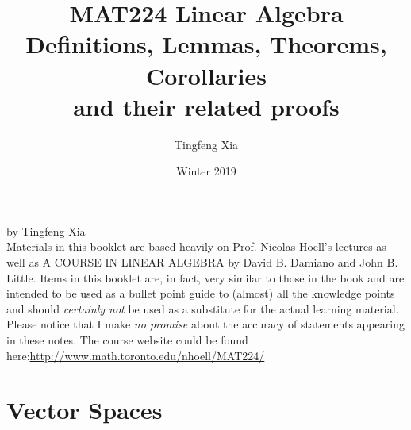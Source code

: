 \documentclass[oneside, 12pt]{book}
\title{%
  \textbf{MAT224 Linear Algebra}\\
  \large Definitions, Lemmas, Theorems, Corollaries \\
    and their related proofs}
\author{Tingfeng Xia}
\date{Winter 2019}
\newcommand{\tit}[1]{\textit{#1}}
\begin{document}
\maketitle
\newpage %
\mbox{}
\vfill
by Tingfeng Xia \\


Materials in this booklet are based heavily on Prof. Nicolas Hoell's lectures as well as A COURSE IN LINEAR ALGEBRA by David B. Damiano and John B. Little.\newline\newline
Items in this booklet are, in fact, very similar to those in the book and are intended to be used as a bullet point guide to (almost) all the knowledge points and should \tit{certainly not} be used as a substitute for the actual learning material. Please notice that I make\tit{ no promise} about the accuracy of statements appearing in these notes.\newline\newline
The course website could be found here:\newline \url{http://www.math.toronto.edu/nhoell/MAT224/}
\newpage
\tableofcontents

\chapter{Vector Spaces}
\end{document}
